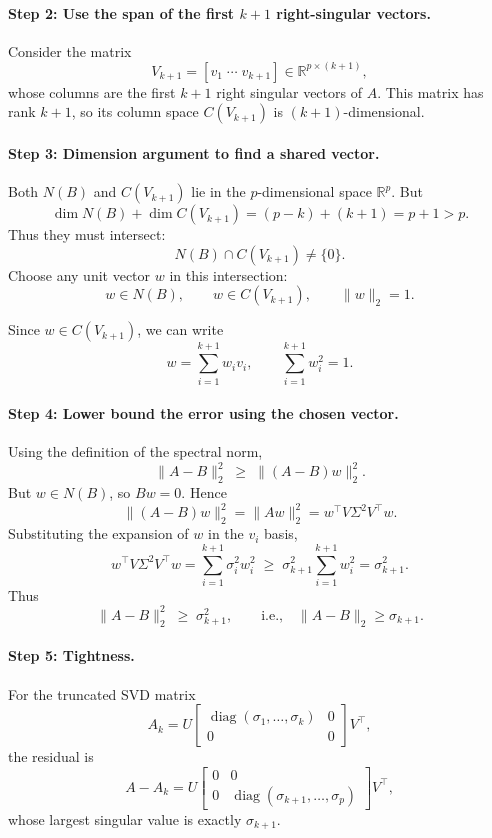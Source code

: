 \documentclass{article}
\begin{document}
\paragraph{Step 2: Use the span of the first $k{+}1$ right-singular vectors.}
Consider the matrix
\[
V_{k+1} = [v_1 \; \cdots \; v_{k+1}] \in \mathbb{R}^{p \times (k+1)},
\]
whose columns are the first $k+1$ right singular vectors of $A$.  
This matrix has rank $k{+}1$, so its column space $C(V_{k+1})$ is $(k{+}1)$-dimensional.

\paragraph{Step 3: Dimension argument to find a shared vector.}
Both $N(B)$ and $C(V_{k+1})$ lie in the $p$-dimensional space $\mathbb{R}^p$.  
But
\[
\dim N(B) + \dim C(V_{k+1})
= (p-k) + (k+1)
= p + 1 > p.
\]
Thus they must intersect:
\[
N(B) \cap C(V_{k+1}) \neq \{0\}.
\]
Choose any unit vector $w$ in this intersection:
\[
w \in N(B), \qquad w \in C(V_{k+1}), \qquad \|w\|_2 = 1.
\]

Since $w \in C(V_{k+1})$, we can write
\[
w = \sum_{i=1}^{k+1} w_i v_i,
\qquad
\sum_{i=1}^{k+1} w_i^2 = 1.
\]

\paragraph{Step 4: Lower bound the error using the chosen vector.}
Using the definition of the spectral norm,
\[
\|A - B\|_2^2
\;\ge\;
\|(A - B) w\|_2^2.
\]
But $w \in N(B)$, so $Bw = 0$. Hence
\[
\|(A - B) w\|_2^2
= \|A w\|_2^2
= w^\top V \Sigma^2 V^\top w.
\]
Substituting the expansion of $w$ in the $v_i$ basis,
\[
w^\top V \Sigma^2 V^\top w
= \sum_{i=1}^{k+1} \sigma_i^2 w_i^2
\;\ge\;
\sigma_{k+1}^2 \sum_{i=1}^{k+1} w_i^2
= \sigma_{k+1}^2.
\]
Thus
\[
\|A - B\|_2^2 \;\ge\; \sigma_{k+1}^2,
\qquad
\text{i.e.,} \quad
\|A - B\|_2 \ge \sigma_{k+1}.
\]

\paragraph{Step 5: Tightness.}
For the truncated SVD matrix
\[
A_k = U
\begin{bmatrix}
\operatorname{diag}(\sigma_1,\dots,\sigma_k) & 0 \\
0 & 0
\end{bmatrix}
V^\top,
\]
the residual is
\[
A - A_k = U
\begin{bmatrix}
0 & 0 \\
0 & \operatorname{diag}(\sigma_{k+1},\dots,\sigma_p)
\end{bmatrix}
V^\top,
\]
whose largest singular value is exactly $\sigma_{k+1}$.
\end{document}
